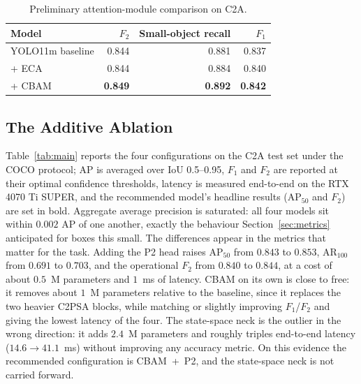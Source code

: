 \begin{table}[H]
  \centering
  \caption{Preliminary attention-module comparison on C2A.}
  \label{tab:eca}
  \begin{tabular}{@{}l r r r@{}}
    \toprule
    Model & $F_2$ & Small-object recall & $F_1$ \\
    \midrule
    YOLO11m baseline & 0.844 & 0.881 & 0.837 \\
    + ECA            & 0.844 & 0.884 & 0.840 \\
    + CBAM           & \textbf{0.849} & \textbf{0.892} & \textbf{0.842} \\
    \bottomrule
  \end{tabular}
\end{table}

\subsection{The Additive Ablation}
Table~\ref{tab:main} reports the four configurations on the C2A test set
under the COCO protocol; AP is averaged over IoU 0.5--0.95, $F_1$ and $F_2$
are reported at their optimal confidence thresholds, latency is measured
end-to-end on the RTX 4070 Ti SUPER, and the recommended model's headline
results ($\mathrm{AP}_{50}$ and $F_2$) are set in bold. Aggregate average
precision is saturated: all
four models sit within $0.002$ AP of one another, exactly the behaviour
Section~\ref{sec:metrics} anticipated for boxes this small. The differences
appear in the metrics that matter for the task. Adding the P2 head raises
$\mathrm{AP}_{50}$ from $0.843$ to $0.853$, $\mathrm{AR}_{100}$ from $0.691$
to $0.703$, and the operational $F_2$ from $0.840$ to $0.844$, at a cost of
about $0.5$~M parameters and $1$~ms of latency. CBAM on its own is close to
free: it removes about $1$~M parameters relative to the baseline, since it
replaces the two heavier C2PSA blocks, while matching or slightly improving
$F_1$/$F_2$ and giving the lowest latency of the four. The state-space neck
is the outlier in the wrong direction: it adds $2.4$~M parameters and
roughly triples end-to-end latency ($14.6 \to 41.1$~ms) without improving
any accuracy metric. On this evidence the recommended configuration is
CBAM~+~P2, and the state-space neck is not carried forward.

